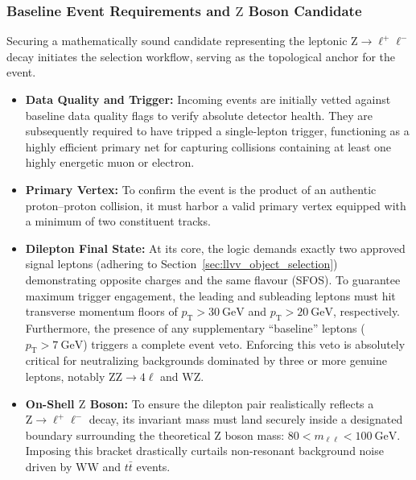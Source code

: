 \subsubsection{Baseline Event Requirements and $\text{Z}$ Boson Candidate}
Securing a mathematically sound candidate representing the leptonic $\text{Z} \to \ell^+\ell^-$ decay initiates the selection workflow, serving as the topological anchor for the event.
\begin{itemize}
    \item \textbf{Data Quality and Trigger:} Incoming events are initially vetted against baseline data quality flags to verify absolute detector health. They are subsequently required to have tripped a single-lepton trigger, functioning as a highly efficient primary net for capturing collisions containing at least one highly energetic muon or electron.
    \item \textbf{Primary Vertex:} To confirm the event is the product of an authentic proton--proton collision, it must harbor a valid primary vertex equipped with a minimum of two constituent tracks.
    \item \textbf{Dilepton Final State:} At its core, the logic demands exactly two approved signal leptons (adhering to Section~\ref{sec:llvv_object_selection}) demonstrating opposite charges and the same flavour (SFOS). To guarantee maximum trigger engagement, the leading and subleading leptons must hit transverse momentum floors of $p_{\text{T}} > 30~\text{GeV}$ and $p_{\text{T}} > 20~\text{GeV}$, respectively. Furthermore, the presence of any supplementary ``baseline'' leptons ($p_{\text{T}} > 7~\text{GeV}$) triggers a complete event veto. Enforcing this veto is absolutely critical for neutralizing backgrounds dominated by three or more genuine leptons, notably $\text{ZZ} \to 4\ell$ and $\text{WZ}$.
    \item \textbf{On-Shell $\text{Z}$ Boson:} To ensure the dilepton pair realistically reflects a $\text{Z} \to \ell^+\ell^-$ decay, its invariant mass must land securely inside a designated boundary surrounding the theoretical $\text{Z}$ boson mass: $80 < m_{\ell\ell} < 100~\text{GeV}$. Imposing this bracket drastically curtails non-resonant background noise driven by $\text{WW}$ and $t\bar{t}$ events.
\end{itemize}

